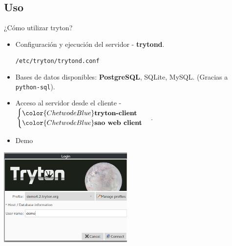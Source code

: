     \subsection{Uso}

	\begin{frame}[fragile=singleslide]{¿Cómo utilizar tryton?}
        \begin{itemize}
            \fontsize{10}{8}\selectfont
            \item Configuración y ejecución del servidor - {\color{ChetwodeBlue}\textbf{trytond}}. \\
                \begin{center}
                    \texttt{/etc/tryton/trytond.conf}
                \end{center}
            \item Bases de datos disponibles: \textbf{PostgreSQL}, SQLite, MySQL. (Gracias a \texttt{python-sql}).
            \item Acceso al servidor desde el cliente - $\begin{cases} {\color{ChetwodeBlue}\textbf{tryton-client}} \\ {\color{ChetwodeBlue}\textbf{sao web client}} \end{cases}$.
            \item Demo
        \end{itemize}
        \vspace*{-5mm}
        \begin{center}
            \includegraphics[width=0.5\textwidth]{./Images/demo.png}
        \end{center}
	\end{frame}

